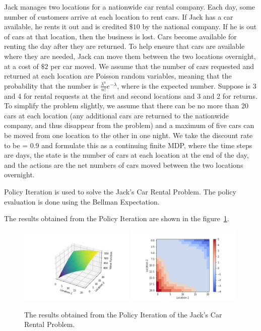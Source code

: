 Jack manages two locations for a nationwide car rental company. Each day, some number of customers arrive at each location to rent cars. If Jack has a car available, he rents it out and is credited $\$10$ by the national company. If he is out of cars at that location, then the business is lost. Cars become available for renting the day after they are returned. To help ensure that cars are available where they are needed, Jack can move them between the two locations overnight, at a cost of $\$2$ per car moved. We assume that the number of cars requested and returned at each location are Poisson random variables, meaning that the probability that the number is $\frac{\lambda^n}{n!}e^{-\lambda}$, where is the expected number. Suppose is 3 and 4 for rental requests at the first and second locations and 3 and 2 for returns. To simplify the problem slightly, we assume that there can be no more than 20 cars at each location (any additional cars are returned to the nationwide company, and thus disappear from the problem) and a maximum of five cars can be moved from one location to the other in one night. We take the discount rate to be = 0.9 and formulate this as a continuing finite MDP, where the time steps are days, the state is the number of cars at each location at the end of the day, and the actions are the net numbers of cars moved between the two locations overnight.

Policy Iteration is used to solve the Jack's Car Rental Problem. The policy evaluation is done using the Bellman Expectation.

The results obtained from the Policy Iteration are shown in the figure~\ref{fig:jack-car-rental}.

\begin{figure}[h!]
    \centering
    \includegraphics[width=0.49\textwidth]{images/jack-1-3d.png}
    \includegraphics[width=0.49\textwidth]{images/jack-1-pi.png}
    \caption{The results obtained from the Policy Iteration of the Jack's Car Rental Problem.}
    \label{fig:jack-car-rental}
\end{figure}

